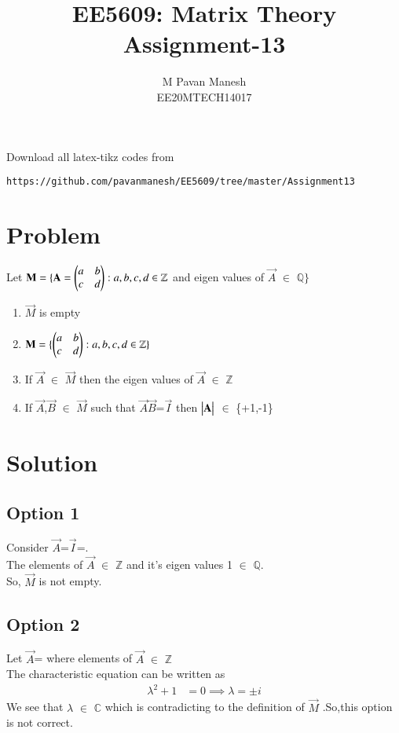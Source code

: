 \documentclass[journal,12pt,twocolumn]{IEEEtran}
\begin{document}
     \def\rightbox#1{\makebox[0in][r]{#1}}
     \def\centbox#1{\makebox[0in]{#1}}
     \def\topbox#1{\raisebox{-\baselineskip}[0in][0in]{#1}}
     \def\midbox#1{\raisebox{-0.5\baselineskip}[0in][0in]{#1}}
\vspace{3cm}
\title{EE5609: Matrix Theory\\
          Assignment-13\\}
\author{M Pavan Manesh\\
EE20MTECH14017 }
\maketitle
\newpage
\bigskip
\renewcommand{\thefigure}{\theenumi}
\renewcommand{\thetable}{\theenumi}
Download all latex-tikz codes from 
%
\begin{lstlisting}
https://github.com/pavanmanesh/EE5609/tree/master/Assignment13
\end{lstlisting}
%
\section{Problem}
Let $\mathbf{M} =\{\mathbf{A}=\begin{pmatrix}a&b\\c&d\end{pmatrix} : a,b,c,d \in \mathbb{Z} $ and eigen values of $\vec{A}$ $\in$ $\mathbb{Q}$$\}$ \label{main}
\begin{enumerate}
    \item $\vec{M}$ is empty
    \item $\mathbf{M} =\{\begin{pmatrix}a&b\\c&d\end{pmatrix} : a,b,c,d \in \mathbb{Z} \}$
    \item If $\vec{A}$ $\in$ $\vec{M}$ then the eigen values of $\vec{A}$ $\in$ $\mathbb{Z}$
    \item If $\vec{A}$,$\vec{B}$ $\in$ $\vec{M}$ such that $\vec{A} \vec{B}$=$\vec{I}$ then $\begin{vmatrix}\mathbf{A}\end{vmatrix}$ $\in$ \{+1,-1\}
\end{enumerate}
\section{Solution}
\subsection{Option 1}
Consider $\vec{A}$=$\vec{I}$=.\\The elements of $\vec{A}$ $\in$ $\mathbb{Z}$ and it's eigen values 1 $\in$ $\mathbb{Q}$.\\
So, $\vec{M}$ is not empty.
\subsection{Option 2}
Let $\vec{A}$= where elements of $\vec{A}$ $\in$ $\mathbb{Z}$\\
The characteristic equation can be written as
\begin{align}
    \lambda^2+1 &= 0 \implies \lambda = \pm i
\end{align}
We see that $\lambda$ $\in$ $\mathbb{C}$ which is contradicting to the definition of $\vec{M}$ .So,this option is not correct.
\end{document}
